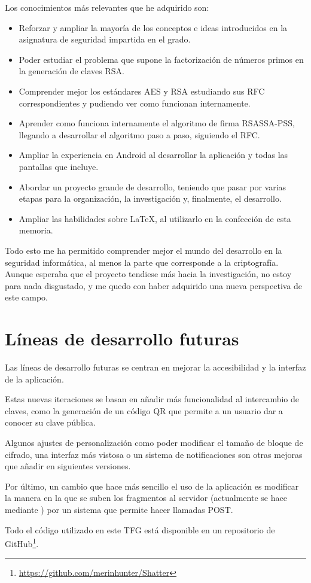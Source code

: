 Los conocimientos más relevantes que he adquirido son:

\begin{itemize}
  \item Reforzar y ampliar la mayoría de los conceptos e ideas introducidos en la asignatura de seguridad impartida en el grado.
  \item Poder estudiar el problema que supone la factorización de números primos en la generación de claves RSA.
  \item Comprender mejor los estándares AES y RSA estudiando sus RFC correspondientes y pudiendo ver como funcionan internamente.
  \item Aprender como funciona internamente el algoritmo de firma RSASSA-PSS, llegando a desarrollar el algoritmo paso a paso, siguiendo el RFC.
  \item Ampliar la experiencia en Android al desarrollar la aplicación y todas las pantallas que incluye.
  \item Abordar un proyecto grande de desarrollo, teniendo que pasar por varias etapas para la organización, la investigación y, finalmente, el desarrollo.
  \item Ampliar las habilidades sobre \LaTeX, al utilizarlo en la confección de esta memoria.
\end{itemize}

Todo esto me ha permitido comprender mejor el mundo del desarrollo en la seguridad informática, al menos la parte que corresponde a la criptografía. Aunque esperaba que el proyecto tendiese más hacia la investigación, no estoy para nada disgustado, y me quedo con haber adquirido una nueva perspectiva de este campo.

\section{Líneas de desarrollo futuras}

Las líneas de desarrollo futuras se centran en mejorar la accesibilidad y la interfaz de la aplicación.

Estas nuevas iteraciones se basan en añadir más funcionalidad al intercambio de claves, como la generación de un código QR que permite a un usuario dar a conocer su clave pública.

Algunos ajustes de personalización como poder modificar el tamaño de bloque de cifrado, una interfaz más vistosa o un sistema de notificaciones son otras mejoras que añadir en siguientes versiones.

Por último, un cambio que hace más sencillo el uso de la aplicación es modificar la manera en la que se suben los fragmentos al servidor (actualmente se hace mediante ) por un sistema que permite hacer llamadas POST.

Todo el código utilizado en este TFG está disponible en un repositorio de GitHub\footnote{\url{https://github.com/merinhunter/Shatter}}.
